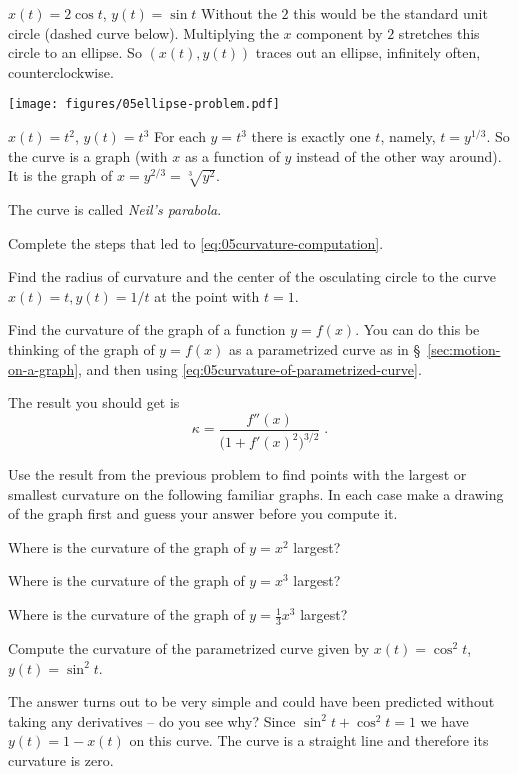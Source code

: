 \begin{multicols}{2}
\subprob  \(x(t) =  2\cos t \), \(y(t) = \sin t  \)
\answer
Without the $2$ this would be the standard unit circle (dashed curve below).
Multiplying the $x$ component by $2$ stretches this circle to an ellipse.  So
$(x(t), y(t))$ traces out an ellipse, infinitely often, counterclockwise.

\begin{center}
  \texttt{[image: figures/05ellipse-problem.pdf]}
\end{center}

\endanswer

\subprob  \(x(t) =  t^2 \), \(y(t) = t^3  \)
\answer
For each $y=t^3$ there is exactly one $t$, namely, $t=y^{1/3}$.  So the curve is
a graph (with $x$ as a function of $y$ instead of the other way around).  It
is the graph of $x=y^{2/3} = \sqrt[3]{y^2}$.
\begin{center}
  
\end{center}
The curve is called \emph{Neil's parabola}.
\endanswer

\problem Complete the steps that led to \eqref{eq:05curvature-computation}.

\problem Find the radius of curvature and the center of the osculating circle to
the curve $x(t)=t, y(t) = 1/t$ at the point with $t=1$.

\problem  Find the curvature of the graph of a function $y=f(x)$.  You
can do this be thinking of the graph of $y=f(x)$ as a parametrized
curve as in \S~\ref{sec:motion-on-a-graph}, and then using
\eqref{eq:05curvature-of-parametrized-curve}.

The result you should get is
\[
\kappa = \frac{f''(x)} {\bigl(1+f'(x)^2\bigr)^{3/2}}\;.
\]

\problem Use the result from the previous problem to find points with the
largest or smallest curvature on the following familiar graphs.  In each case
make a drawing of the graph first and guess your answer before you compute it.

\subprob Where is the curvature of the graph of $y=x^2$ largest?

\subprob Where is the curvature of the graph of $y=x^3$ largest?

\subprob Where is the curvature of the graph of $y=\frac13x^3$ largest?

\problem \carefulnow  Compute the curvature of the parametrized curve given by
$x(t) = \cos^2 t$, $y(t) = \sin^2 t$.

The answer turns out to be very simple and could have been predicted without
taking any derivatives -- do you see why?
\answer
Since $\sin^2t + \cos^2 t =1$ we have $y(t) = 1-x(t)$ on this curve.  The curve
is a straight line and therefore its curvature is zero.
\endanswer


\end{multicols}
